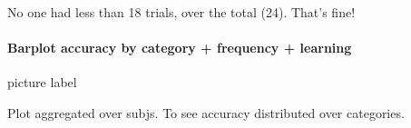 \documentclass[
]{article}
\newenvironment{Shaded}{\begin{snugshade}}{\end{snugshade}}
\newcommand{\DataTypeTok}[1]{\textcolor[rgb]{0.13,0.29,0.53}{#1}}
\newcommand{\DecValTok}[1]{\textcolor[rgb]{0.00,0.00,0.81}{#1}}
\newcommand{\KeywordTok}[1]{\textcolor[rgb]{0.13,0.29,0.53}{\textbf{#1}}}
\newcommand{\NormalTok}[1]{#1}
\newcommand{\OperatorTok}[1]{\textcolor[rgb]{0.81,0.36,0.00}{\textbf{#1}}}
\newcommand{\StringTok}[1]{\textcolor[rgb]{0.31,0.60,0.02}{#1}}
\begin{document}
No one had less than 18 trials, over the total (24). That's fine!

\hypertarget{barplot-accuracy-by-category-frequency-learning}{%
\paragraph{Barplot accuracy by category + frequency +
learning}\label{barplot-accuracy-by-category-frequency-learning}}

picture label

\begin{Shaded}
\end{Shaded}

Plot aggregated over subjs. To see accuracy distributed over categories.
\end{document}
